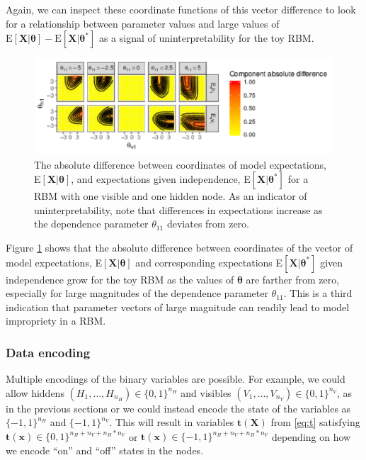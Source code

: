 \documentclass[AMS,STIX1COL]{WileyNJD-v2}
\newcommand{\nv}{{n_{\scriptscriptstyle V}}}
\newcommand{\nh}{{n_{\scriptscriptstyle H}}}
\begin{document}
Again, we can inspect these coordinate functions of this vector
difference to look for a relationship between parameter values and large
values of
\(\text{E}[\boldsymbol X|\boldsymbol \theta] - \text{E}[\boldsymbol X| \boldsymbol \theta^*]\)
as a signal of uninterpretability for the toy RBM.

\par

\begin{figure}

{\centering \includegraphics{paper_files/figure-latex/uninterp-1} 

}

\caption{\label{fig:uninterp}The absolute difference between coordinates of model expectations, E$\left[\boldsymbol X | \boldsymbol \theta\right]$, and expectations given independence, E$\left[\boldsymbol X | \boldsymbol \theta^* \right ]$ for a RBM with one visible and one hidden node. As an indicator of uninterpretability, note that differences in expectations increase as the dependence parameter $\theta_{11}$ deviates from zero.}\label{fig:uninterp}
\end{figure}

Figure \ref{fig:uninterp} shows that the absolute difference between
coordinates of the vector of model expectations,
E\(\left[\boldsymbol X | \boldsymbol \theta\right]\) and corresponding
expectations E\(\left[\boldsymbol X | \boldsymbol \theta^*\right ]\)
given independence grow for the toy RBM as the values of
\(\boldsymbol \theta\) are farther from zero, especially for large
magnitudes of the dependence parameter \(\theta_{11}\). This is a third
indication that parameter vectors of large magnitude can readily lead to
model impropriety in a RBM.

\hypertarget{data-encoding}{%
\subsubsection{Data encoding}\label{data-encoding}}

Multiple encodings of the binary variables are possible. For example, we
could allow hiddens \((H_1, \dots, H_\nh) \in \{0,1\}^\nh\) and visibles
\((V_1, \dots, V_\nv) \in \{0,1\}^\nv\), as in the previous sections or
we could instead encode the state of the variables as \(\{-1,1\}^\nh\)
and \(\{-1,1\}^\nv\). This will result in variables
\(\boldsymbol t(\boldsymbol X)\) from \eqref{eq:t} satisfying
\(\boldsymbol t(\boldsymbol x) \in \{0,1\}^{\nh + \nv + \nh*\nv}\) or
\(\boldsymbol t(\boldsymbol x) \in \{-1,1\}^{\nh + \nv + \nh*\nv}\)
depending on how we encode ``on'' and ``off'' states in the nodes.
\end{document}
